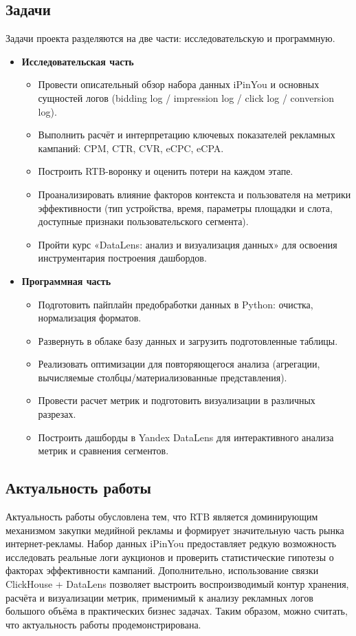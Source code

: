 \subsection{Задачи}
Задачи проекта разделяются на две части: исследовательскую и программную.

\begin{itemize}
  \item \textbf{Исследовательская часть}
    \begin{itemize}
        \item Провести описательный обзор набора данных iPinYou и основных сущностей логов (bidding log / impression log / click log / conversion log).
        \item Выполнить расчёт и интерпретацию ключевых показателей рекламных кампаний: CPM, CTR, CVR, eCPC, eCPA.
        \item Построить RTB-воронку и оценить потери на каждом этапе.
        \item Проанализировать влияние факторов контекста и пользователя на метрики эффективности (тип устройства, время, параметры площадки и слота, доступные признаки пользовательского сегмента).
        \item Пройти курс «DataLens: анализ и визуализация данных» для освоения инструментария построения дашбордов.
    \end{itemize}

  \item \textbf{Программная часть}
      \begin{itemize}
        \item Подготовить пайплайн предобработки данных в Python: очистка, нормализация форматов.
        \item Развернуть в облаке базу данных и загрузить подготовленные таблицы.
        \item Реализовать оптимизации для повторяющегося анализа (агрегации, вычисляемые столбцы/материализованные представления).
        \item Провести расчет метрик и подготовить визуализации в различных разрезах.
        \item Построить дашборды в Yandex DataLens для интерактивного анализа метрик и сравнения сегментов.
      \end{itemize}
\end{itemize}

\subsection{Актуальность работы}
Актуальность работы обусловлена тем, что RTB является доминирующим механизмом закупки медийной рекламы и формирует значительную часть рынка интернет-рекламы. Набор данных iPinYou предоставляет редкую возможность исследовать реальные логи аукционов и проверить статистические гипотезы о факторах эффективности кампаний. Дополнительно, использование связки ClickHouse + DataLens позволяет выстроить воспроизводимый контур хранения, расчёта и визуализации метрик, применимый к анализу рекламных логов большого объёма в практических бизнес задачах. Таким образом, можно считать, что актуальность работы продемонстрирована.


